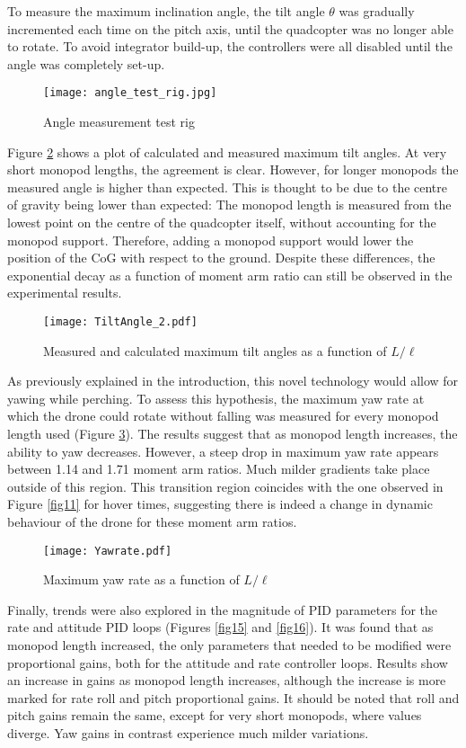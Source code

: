 \documentclass[12pt,a4paper]{article}
\begin{document}
To measure the maximum inclination angle, the tilt angle $\theta$ was gradually incremented each time on the pitch axis, until the quadcopter was no longer able to rotate. To avoid integrator build-up, the controllers were all disabled until the angle was completely set-up.
\begin{figure}[h!]
\centering
 \texttt{[image: angle\_test\_rig.jpg]}
  \caption{Angle measurement test rig}
  \label{fig12}
\end{figure}

Figure \ref{fig13} shows a plot of calculated and measured maximum tilt angles. At very short monopod lengths, the agreement is clear. However, for longer monopods the measured angle is higher than expected. This is thought to be due to the centre of gravity being lower than expected: The monopod length is measured from the lowest point on the centre of the quadcopter itself, without accounting for the monopod support. Therefore, adding a monopod support would lower the position of the CoG with respect to the ground. Despite these differences, the exponential decay as a function of moment arm ratio can still be observed in the experimental results.

\begin{figure}[h!]
\centering
 \texttt{[image: TiltAngle\_2.pdf]}
  \caption{Measured and calculated maximum tilt angles as a function of $L/\ell$}
  \label{fig13}
\end{figure}

As previously explained in the introduction, this novel technology would allow for yawing while perching. To assess this hypothesis, the maximum yaw rate at which the drone could rotate without falling was measured for every monopod length used (Figure \ref{fig14}). The results suggest that as monopod length increases, the ability to yaw decreases. However, a steep drop in maximum yaw rate appears between 1.14 and 1.71 moment arm ratios. Much milder gradients take place outside of this region. This transition region coincides with the one observed in Figure \ref{fig11} for hover times, suggesting there is indeed a change in dynamic behaviour of the drone for these moment arm ratios.

\begin{figure}[h!]
\centering
 \texttt{[image: Yawrate.pdf]}
  \caption{Maximum yaw rate as a function of $L/\ell$}
  \label{fig14}
\end{figure}

Finally, trends were also explored in the magnitude of PID parameters for the rate and attitude PID loops (Figures \ref{fig15} and \ref{fig16}). It was found that as monopod length increased, the only parameters that needed to be modified were proportional gains, both for the attitude and rate controller loops. Results show an increase in gains as monopod length increases, although the increase is more marked for rate roll and pitch proportional gains. It should be noted that roll and pitch gains remain the same, except for very short monopods, where values diverge. Yaw gains in contrast experience much milder variations.
\end{document}
